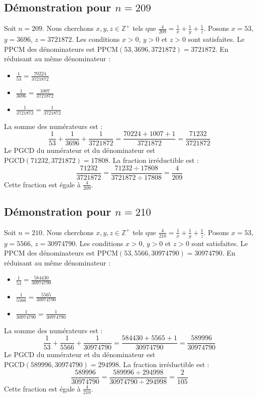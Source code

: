 \documentclass[11pt,a4paper]{article}
\begin{document}
\subsection{Démonstration pour $n = 209$}
Soit $n = 209$. Nous cherchons $x, y, z \in \mathbb{Z}^{+}$ tels que $\frac{4}{209} = \frac{1}{x} + \frac{1}{y} + \frac{1}{z}$.
Posons $x = 53$, $y = 3696$, $z = 3721872$.
Les conditions $x > 0$, $y > 0$ et $z > 0$ sont satisfaites.
Le PPCM des dénominateurs est $\text{PPCM}(53, 3696, 3721872) = 3721872$.
En réduisant au même dénominateur :
\begin{itemize}
    \item $\frac{1}{53} = \frac{70224}{3721872}$
    \item $\frac{1}{3696} = \frac{1007}{3721872}$
    \item $\frac{1}{3721872} = \frac{1}{3721872}$
\end{itemize}
La somme des numérateurs est :
$$ \frac{1}{53} + \frac{1}{3696} + \frac{1}{3721872} = \frac{70224 + 1007 + 1}{3721872} = \frac{71232}{3721872} $$
Le PGCD du numérateur et du dénominateur est $\text{PGCD}(71232, 3721872) = 17808$.
La fraction irréductible est :
$$ \frac{71232}{3721872} = \frac{71232 \div 17808}{3721872 \div 17808} = \frac{4}{209} $$
Cette fraction est égale à $\frac{4}{209}$.

\subsection{Démonstration pour $n = 210$}
Soit $n = 210$. Nous cherchons $x, y, z \in \mathbb{Z}^{+}$ tels que $\frac{4}{210} = \frac{1}{x} + \frac{1}{y} + \frac{1}{z}$.
Posons $x = 53$, $y = 5566$, $z = 30974790$.
Les conditions $x > 0$, $y > 0$ et $z > 0$ sont satisfaites.
Le PPCM des dénominateurs est $\text{PPCM}(53, 5566, 30974790) = 30974790$.
En réduisant au même dénominateur :
\begin{itemize}
    \item $\frac{1}{53} = \frac{584430}{30974790}$
    \item $\frac{1}{5566} = \frac{5565}{30974790}$
    \item $\frac{1}{30974790} = \frac{1}{30974790}$
\end{itemize}
La somme des numérateurs est :
$$ \frac{1}{53} + \frac{1}{5566} + \frac{1}{30974790} = \frac{584430 + 5565 + 1}{30974790} = \frac{589996}{30974790} $$
Le PGCD du numérateur et du dénominateur est $\text{PGCD}(589996, 30974790) = 294998$.
La fraction irréductible est :
$$ \frac{589996}{30974790} = \frac{589996 \div 294998}{30974790 \div 294998} = \frac{2}{105} $$
Cette fraction est égale à $\frac{4}{210}$.
\end{document}
